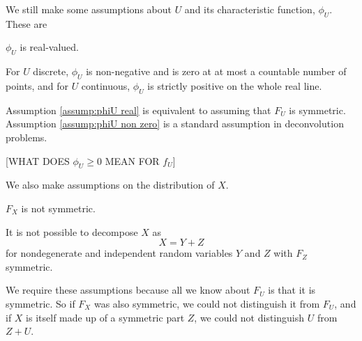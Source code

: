 	We still make some assumptions about $U$ and its characteristic function, $\phi_U$. These are 
	\begin{assumption}
	\label{assump:phiU real}
		$\phi_U$ is real-valued.
	\end{assumption}
	\begin{assumption}
	\label{assump:phiU non zero}
		For $U$ discrete, $\phi_U$ is non-negative and is zero at at most a countable number of points, and for $U$ continuous, $\phi_U$ is strictly positive on the whole real line.
	\end{assumption}

	Assumption \ref{assump:phiU real} is equivalent to assuming that $F_U$ is symmetric. Assumption \ref{assump:phiU non zero} is a standard assumption in deconvolution problems.

	[WHAT DOES $\phi_U \geq 0$ MEAN FOR $f_U$]

	We also make assumptions on the distribution of $X$. 
	\begin{assumption}
	\label{assumpt: X not symmetric}
		$F_X$ is not symmetric.
	\end{assumption}
	\begin{assumption}
		\label{assump: X indecomposable}
		It is not possible to decompose $X$ as
		\begin{equation}
			X = Y + Z
		\end{equation}
		for nondegenerate and independent random variables $Y$ and $Z$ with $F_Z$ symmetric.
	\end{assumption}

	We require these assumptions because all we know about $F_U$ is that it is symmetric. So if $F_X$ was also symmetric, we could not distinguish it from $F_U$, and if $X$ is itself made up of a symmetric part $Z$, we could not distinguish $U$ from $Z+U$.


